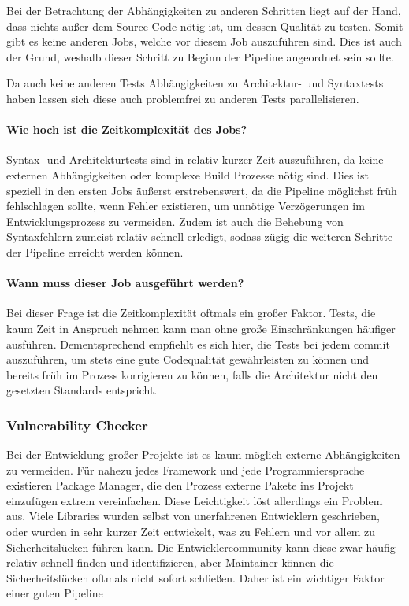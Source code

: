 Bei der Betrachtung der Abhängigkeiten zu anderen Schritten liegt auf der Hand, dass nichts außer dem Source Code nötig ist, um dessen Qualität zu testen.
Somit gibt es keine anderen Jobs, welche vor diesem Job auszuführen sind.
Dies ist auch der Grund, weshalb dieser Schritt zu Beginn der Pipeline angeordnet sein sollte.

Da auch keine anderen Tests Abhängigkeiten zu Architektur- und Syntaxtests haben lassen sich diese auch problemfrei zu anderen Tests parallelisieren.

\paragraph{Wie hoch ist die Zeitkomplexität des Jobs?}

Syntax- und Architekturtests sind in relativ kurzer Zeit auszuführen, da keine externen Abhängigkeiten oder komplexe Build Prozesse nötig sind.
Dies ist speziell in den ersten Jobs äußerst erstrebenswert, da die Pipeline möglichst früh fehlschlagen sollte, wenn Fehler existieren, um unnötige Verzögerungen im Entwicklungsprozess zu vermeiden.
Zudem ist auch die Behebung von Syntaxfehlern zumeist relativ schnell erledigt, sodass zügig die weiteren Schritte der Pipeline erreicht werden können.

\paragraph{Wann muss dieser Job ausgeführt werden?}

Bei dieser Frage ist die Zeitkomplexität oftmals ein großer Faktor.
Tests, die kaum Zeit in Anspruch nehmen kann man ohne große Einschränkungen häufiger ausführen.
Dementsprechend empfiehlt es sich hier, die Tests bei jedem commit auszuführen, um stets eine gute Codequalität gewährleisten zu können und bereits früh im Prozess korrigieren zu können, falls die Architektur nicht den gesetzten Standards entspricht.

\subsubsection{Vulnerability Checker}

Bei der Entwicklung großer Projekte ist es kaum möglich externe Abhängigkeiten zu vermeiden.
Für nahezu jedes Framework und jede Programmiersprache existieren Package Manager, die den Prozess externe Pakete ins Projekt einzufügen extrem vereinfachen.
Diese Leichtigkeit löst allerdings ein Problem aus.
Viele Libraries wurden selbst von unerfahrenen Entwicklern geschrieben, oder wurden in sehr kurzer Zeit entwickelt, was zu Fehlern und vor allem zu Sicherheitslücken führen kann.
Die Entwicklercommunity kann diese zwar häufig relativ schnell finden und identifizieren, aber Maintainer können die Sicherheitslücken oftmals nicht sofort schließen.
Daher ist ein wichtiger Faktor einer guten Pipeline

